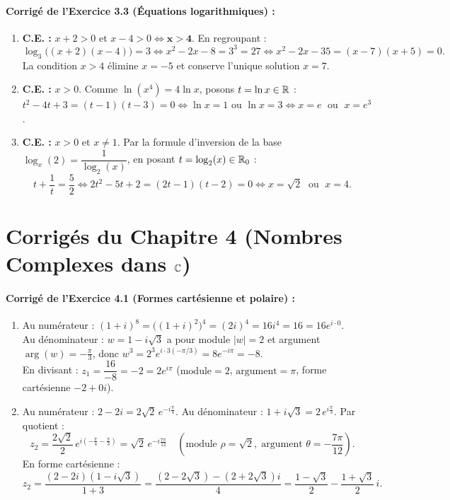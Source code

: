 \paragraph{Corrigé de l'Exercice 3.3 (Équations logarithmiques) :}
\begin{enumerate}[label=(\alph*)]
    \item \textbf{C.E. :} $x + 2 > 0$ et $x - 4 > 0 \iff \mathbf{x > 4}$. En regroupant :
    \[
        \log_3\bigl((x + 2)(x - 4)\bigr) = 3 \iff x^2 - 2x - 8 = 3^3 = 27 \iff x^2 - 2x - 35 = (x - 7)(x + 5) = 0.
    \]
    La condition $x > 4$ élimine $x = -5$ et conserve l'unique solution $\boxed{x = 7}$.
    \item \textbf{C.E. :} $x > 0$. Comme $\ln(x^4) = 4\ln x$, posons $t = \ln x \in \mathbb{R}$ : $t^2 - 4t + 3 = (t - 1)(t - 3) = 0 \iff \ln x = 1 \text{ ou } \ln x = 3 \iff \boxed{x = e \;\text{ ou }\; x = e^3}$.
    \item \textbf{C.E. :} $x > 0$ et $x \neq 1$. Par la formule d'inversion de la base $\log_x(2) = \dfrac{1}{\log_2(x)}$, en posant $t = \log_2(x) \in \mathbb{R}_0$ :
    \[
        t + \frac{1}{t} = \frac{5}{2} \iff 2t^2 - 5t + 2 = (2t - 1)(t - 2) = 0 \iff \boxed{x = \sqrt{2} \;\text{ ou }\; x = 4}.
    \]
\end{enumerate}

\section{Corrigés du Chapitre 4 (Nombres Complexes dans $\mathbb{C}$)}

\paragraph{Corrigé de l'Exercice 4.1 (Formes cartésienne et polaire) :}
\begin{enumerate}[label=(\alph*)]
    \item Au numérateur : $(1 + i)^8 = \bigl((1 + i)^2\bigr)^4 = (2i)^4 = 16 i^4 = 16 = 16 e^{i\cdot 0}$.\\
    Au dénominateur : $w = 1 - i\sqrt{3}$ a pour module $|w| = 2$ et argument $\arg(w) = -\frac{\pi}{3}$, donc $w^3 = 2^3 e^{i\cdot 3(-\pi/3)} = 8 e^{-i\pi} = -8$.\\
    En divisant : $z_1 = \dfrac{16}{-8} = \boxed{-2 = 2 e^{i\pi}}$ ($\text{module} = 2$, $\text{argument} = \pi$, forme cartésienne $-2 + 0i$).
    \item Au numérateur : $2 - 2i = 2\sqrt{2}\,e^{-i\frac{\pi}{4}}$. Au dénominateur : $1 + i\sqrt{3} = 2\,e^{i\frac{\pi}{3}}$. Par quotient :
    \[
        z_2 = \frac{2\sqrt{2}}{2}\,e^{i\left(-\frac{\pi}{4} - \frac{\pi}{3}\right)} = \boxed{\sqrt{2}\,e^{-i\frac{7\pi}{12}}} \quad \left(\text{module } \rho = \sqrt{2},\; \text{argument } \theta = -\frac{7\pi}{12}\right).
    \]
    En forme cartésienne :
    \[
        z_2 = \dfrac{(2 - 2i)(1 - i\sqrt{3})}{1 + 3} = \dfrac{(2 - 2\sqrt{3}) - (2 + 2\sqrt{3})i}{4} = \boxed{\frac{1 - \sqrt{3}}{2} - \frac{1 + \sqrt{3}}{2}\,i}.
    \]
\end{enumerate}

